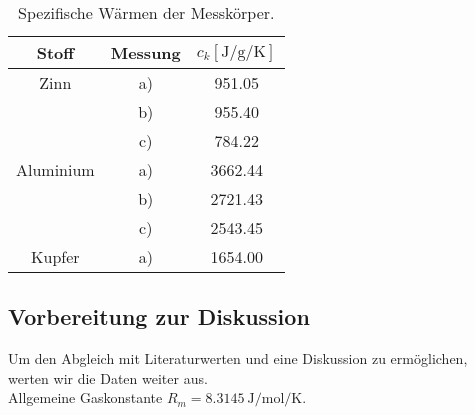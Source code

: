 \begin{table}
    \centering
    \caption{Spezifische Wärmen der Messkörper.}
    \label{tab:c_k-Werte}
    \begin{tabular}{c c | S[table-format=4.2]}
        \toprule
        Stoff & Messung & $c_k[\si{\joule\per\g\per\kelvin}]$ \\
        \midrule
        Zinn        & a) &   951.05 \\
                    & b) &   955.40 \\
                    & c) &   784.22 \\
        Aluminium   & a) &  3662.44 \\
                    & b) &  2721.43 \\
                    & c) &  2543.45 \\
        Kupfer      & a) &  1654.00 \\
        \bottomrule
    \end{tabular}
\end{table}

\subsection{Vorbereitung zur Diskussion}
Um den Abgleich mit Literaturwerten und eine Diskussion zu ermöglichen, werten wir die Daten weiter aus.\\
Allgemeine Gaskonstante $R_m = \SI{8.3145}{\joule\per\mol\per\kelvin}$. \cite{taschenbuch}